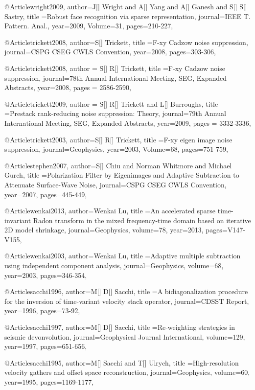@Article{wright2009,
  author={J[] Wright and A[] Yang and A[] Ganesh and S[] S[] Sastry},
  title ={Robust face recognition via sparse representation},
  journal={IEEE T. Pattern. Anal.},
  year=2009,
  Volume=31,
  pages={210-227},
}

@Article{trickett2008,
  author={S[] Trickett},
  title ={{F}-xy Cadzow noise suppression},
  journal={CSPG CSEG CWLS Convention},
  year=2008,
  pages={303-306},
}

@Article{trickett2008,
  author = {S[] R[] Trickett},
  title ={F‐xy Cadzow noise suppression},
  journal={78th Annual International Meeting, SEG, Expanded Abstracts},
  year=2008,
  pages = {2586-2590},
}

@Article{trickett2009,
  author = {S[] R[] Trickett and L[] Burroughs},
  title ={Prestack rank-reducing noise suppression: Theory},
  journal={79th Annual International Meeting, SEG, Expanded Abstracts},
  year=2009,
  pages = {3332-3336},
}

@Article{trickett2003,
  author={S[] R[] Trickett},
  title ={F-xy eigen image noise suppression},
  journal={Geophysics},
  year=2003,
  Volume=68,
  pages={751-759},
}


@Article{stephen2007,
  author={S[] Chiu and Norman Whitmore and Michael Gurch},
  title ={Polarization Filter by Eigenimages and Adaptive Subtraction to Attenuate Surface-Wave Noise},
  journal={CSPG CSEG CWLS Convention},
  year=2007,
  pages={445-449},
}

@Article{wenkai2013,
  author={Wenkai Lu},
  title ={An accelerated sparse time-invariant Radon transform in the mixed frequency-time domain based on iterative 2{D} model shrinkage},
  journal={Geophysics},
  volume=78,
  year=2013,
  pages={V147-V155},
}

@Article{wenkai2003,
  author={Wenkai Lu},
  title ={Adaptive multiple subtraction using independent component analysis},
  journal={Geophysics},
  volume=68,
  year=2003,
  pages={346-354},
}

@Article{sacchi1996,
  author={M[] D[] Sacchi},
  title ={A bidiagonalization procedure for the inversion of time-variant velocity stack operator},
  journal={CDSST Report},
  year=1996,
  pages={73-92},
}

@Article{sacchi1997,
  author={M[] D[] Sacchi},
  title ={Re-weighting strategies in seismic devonvolution},
  journal={Geophysical Journal International},
  volume=129,
  year=1997,
  pages={651-656},
}

@Article{sacchi1995,
  author={M[] Sacchi and T[] Ulrych},
  title ={High-resolution velocity gathers and offset space reconstruction},
  journal={Geophysics},
  volume=60,
  year=1995,
  pages={1169-1177},
}

